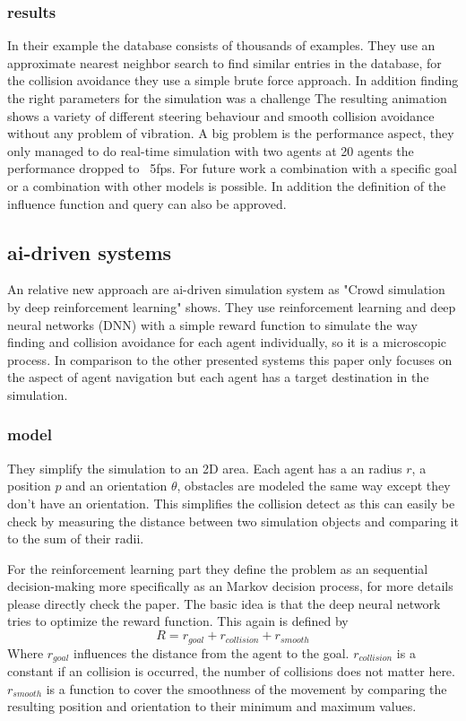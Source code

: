 \documentclass{acmsiggraph}               %
\begin{document}
\subsubsection{results}
In their example the database consists of thousands of examples. They use an approximate nearest neighbor search to find similar entries in the database, for the collision avoidance they use a simple brute force approach. In addition finding the right parameters for the simulation was a challenge
The resulting animation shows a variety of different steering behaviour and smooth collision avoidance without any problem of vibration.  
A big problem is the performance aspect, they only managed to do real-time simulation with two agents at 20 agents the performance dropped to ~5fps. 
For future work a combination with a specific goal or a combination with other models is possible. In addition the definition of the influence function and query can also be approved.

\subsection{ai-driven systems}
An relative new approach are ai-driven simulation system as "Crowd simulation by deep reinforcement learning" \cite{lee_crowd_2018} shows. They use reinforcement learning and deep neural networks (DNN) with a simple reward function to simulate the way finding and collision avoidance for each agent individually, so it is a microscopic process. In comparison to the other presented systems this paper only focuses on the aspect of agent navigation but each agent has a target destination in the simulation.

\subsubsection{model}
They simplify the simulation to an 2D area. Each agent has a an radius $r$, a position $p$ and an orientation $\theta$, obstacles are modeled the same way except they don't have an orientation. 
This simplifies the collision detect as this can easily be check by measuring the distance between two simulation objects and comparing it to the sum of their radii.

For the reinforcement learning part they define the problem as an sequential decision-making more specifically as an Markov decision process, for more details please directly check the paper. The basic idea is that the deep neural network tries to optimize the reward function. This again is defined by 
\begin{equation}
R = r_{goal} + r_{collision} + r_{smooth}
\end{equation}
Where $r_{goal}$ influences the distance from the agent to the goal. $r_{collision}$ is a constant if an collision is occurred, the number of collisions does not matter here. $r_{smooth}$ is a function to cover the smoothness of the movement by comparing the resulting position and orientation to their minimum and maximum values.  
\end{document}

